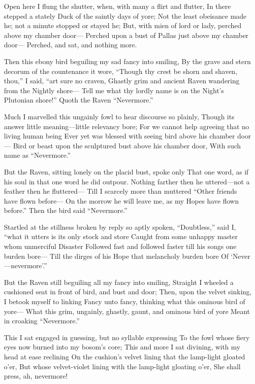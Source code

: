 \documentclass{article}
\begin{document}
    Open here I flung the shutter, when, with many a flirt and flutter,
In there stepped a stately Duck of the saintly days of yore;
    Not the least obeisance made he; not a minute stopped or stayed he;
    But, with mien of lord or lady, perched above my chamber door—
Perched upon a bust of Pallas just above my chamber door—
            Perched, and sat, and nothing more.

Then this ebony bird beguiling my sad fancy into smiling,
By the grave and stern decorum of the countenance it wore,
“Though thy crest be shorn and shaven, thou,” I said, “art sure no craven,
Ghastly grim and ancient Raven wandering from the Nightly shore—
Tell me what thy lordly name is on the Night's Plutonian shore!”
            Quoth the Raven “Nevermore.”

    Much I marvelled this ungainly fowl to hear discourse so plainly,
Though its answer little meaning—little relevancy bore;
    For we cannot help agreeing that no living human being
    Ever yet was blessed with seeing bird above his chamber door—
Bird or beast upon the sculptured bust above his chamber door,
            With such name as ``Nevermore.”

    But the Raven, sitting lonely on the placid bust, spoke only
That one word, as if his soul in that one word he did outpour.
    Nothing farther then he uttered—not a feather then he fluttered—
    Till I scarcely more than muttered ``Other friends have flown before—
On the morrow he will leave me, as my Hopes have flown before.”
            Then the bird said ``Nevermore.”

    Startled at the stillness broken by reply so aptly spoken,
    ``Doubtless,” said I, ``what it utters is its only stock and store
    Caught from some unhappy master whom unmerciful Disaster
    Followed fast and followed faster till his songs one burden bore—
Till the dirges of his Hope that melancholy burden bore
            Of `Never—nevermore'.”

    But the Raven still beguiling all my fancy into smiling,
Straight I wheeled a cushioned seat in front of bird, and bust and door;
    Then, upon the velvet sinking, I betook myself to linking
    Fancy unto fancy, thinking what this ominous bird of yore—
What this grim, ungainly, ghastly, gaunt, and ominous bird of yore
            Meant in croaking ``Nevermore.”

    This I sat engaged in guessing, but no syllable expressing
To the fowl whose fiery eyes now burned into my bosom's core;
    This and more I sat divining, with my head at ease reclining
    On the cushion's velvet lining that the lamp-light gloated o'er,
But whose velvet-violet lining with the lamp-light gloating o'er,
            She shall press, ah, nevermore!
\end{document}
